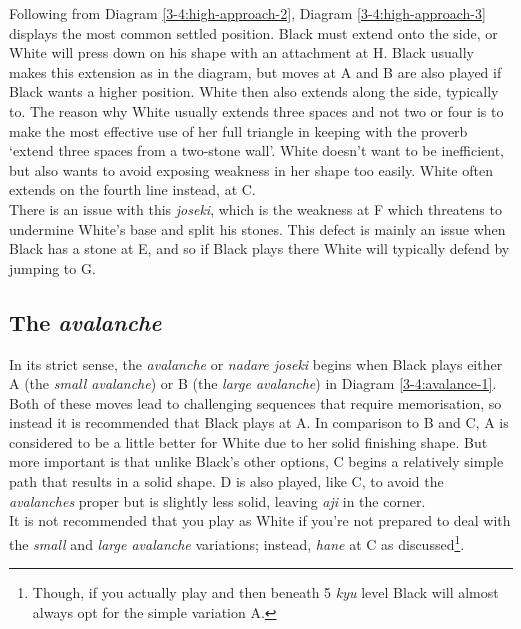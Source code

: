 \documentclass[a5paper,12pt,twoside]{book} %
\newcounter{joseki}                 %
\newcommand{\dref}[1]{Diagram \ref{#1}}
\begin{document}
Following from \dref{3-4:high-approach-2}, \dref{3-4:high-approach-3} displays the most common settled position. Black must extend onto the side, or White will press down on his shape with an attachment at H. Black usually makes this extension as in the diagram, but moves at A and B are also played if Black wants a higher position. White then also extends along the side, typically to{\large\whitestone[7]}. The reason why White usually extends three spaces and not two or four is to make the most effective use of her full triangle in keeping with the proverb `extend three spaces from a two-stone wall'. White doesn't want to be inefficient, but also wants to avoid exposing weakness in her shape too easily. White often extends on the fourth line instead, at C. \\

There is an issue with this \textit{joseki}, which is the weakness at F which threatens to undermine White's base and split his stones. This defect is mainly an issue when Black has a stone at E, and so if Black plays there White will typically defend by jumping to G.\\

\subsection*{The \textit{avalanche}}
In its strict sense, the \textit{avalanche} or \textit{nadare joseki} begins when Black plays either A (the \textit{small avalanche}) or B (the \textit{large avalanche}) in \dref{3-4:avalance-1}. Both of these moves lead to challenging sequences that require memorisation, so instead it is recommended that Black plays at A. In comparison to B and C, A is considered to be a little better for White due to her solid finishing shape. But more important is that unlike Black's other options, C begins a relatively simple path that results in a solid shape. D is also played, like C, to avoid the \textit{avalanches} proper  but is slightly less solid, leaving \textit{aji} in the corner.\\

It is not recommended that you play{\large\whitestone[3]} as White if you're not prepared to deal with the \textit{small} and \textit{large avalanche} variations; instead, \textit{hane} at C as discussed\footnote{Though, if you actually play{\large\whitestone[3]} and{\large\whitestone[5]} then beneath 5 \textit{kyu} level Black will almost always opt for the simple variation A.}.\\
\end{document}
